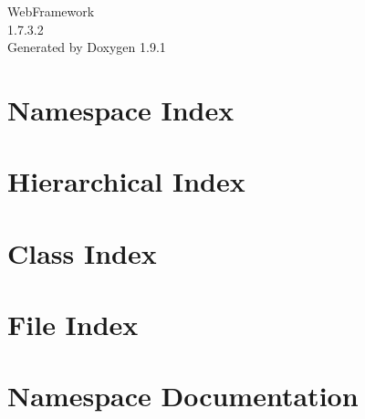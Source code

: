 \let\mypdfximage\pdfximage\def\pdfximage{\immediate\mypdfximage}\documentclass[twoside]{book}
\newcommand{\+}{\discretionary{\mbox{\scriptsize$\hookleftarrow$}}{}{}}
\newcommand{\clearemptydoublepage}{%
  \newpage{\pagestyle{empty}\cleardoublepage}%
}
\begin{document}
\raggedbottom

\hypersetup{pageanchor=false,
             bookmarksnumbered=true,
             pdfencoding=unicode
            }
\begin{titlepage}
\vspace*{7cm}
\begin{center}%
{\Large Web\+Framework \\[1ex]\large 1.\+7.\+3.\+2 }\\
\vspace*{1cm}
{\large Generated by Doxygen 1.9.1}\\
\end{center}
\end{titlepage}
\clearemptydoublepage
{}
\tableofcontents
\clearemptydoublepage
{}
\hypersetup{pageanchor=true}

\chapter{Namespace Index}

\chapter{Hierarchical Index}

\chapter{Class Index}

\chapter{File Index}

\chapter{Namespace Documentation}














\end{document}
